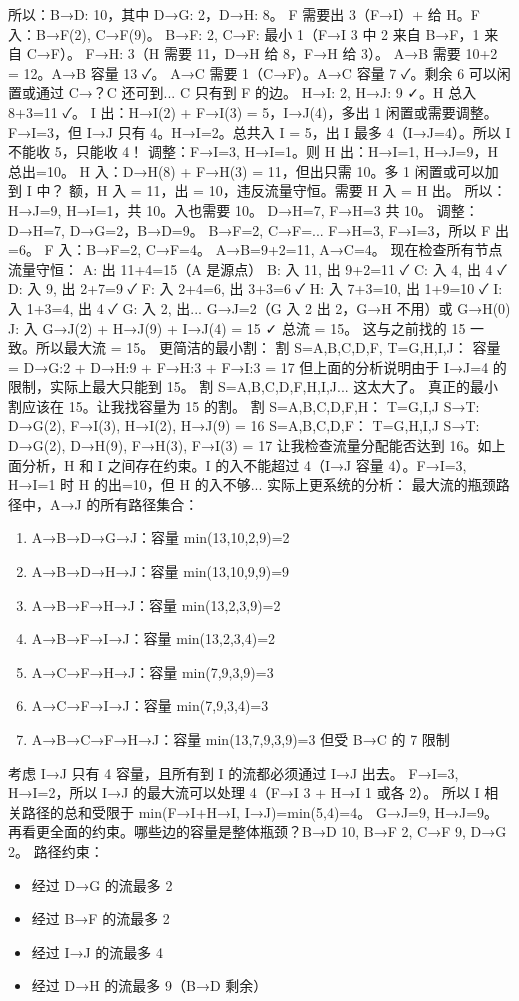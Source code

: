 \documentclass[10pt,a4paper,openany]{ctexbook}
\theoremstyle{definition}
\theoremstyle{remark}
\begin{document}
所以：B→D: 10，其中 D→G: 2，D→H: 8。
F 需要出 3（F→I）+ 给 H。F 入：B→F(2), C→F(9)。
B→F: 2, C→F: 最小 1（F→I 3 中 2 来自 B→F，1 来自 C→F）。
F→H: 3（H 需要 11，D→H 给 8，F→H 给 3）。
A→B 需要 10+2 = 12。A→B 容量 13 ✓。
A→C 需要 1（C→F）。A→C 容量 7 ✓。剩余 6 可以闲置或通过 C→？C 还可到... C 只有到 F 的边。
H→I: 2, H→J: 9 ✓。H 总入 8+3=11 ✓。
I 出：H→I(2) + F→I(3) = 5，I→J(4)，多出 1 闲置或需要调整。
F→I=3，但 I→J 只有 4。H→I=2。总共入 I = 5，出 I 最多 4（I→J=4）。所以 I 不能收 5，只能收 4！
调整：F→I=3, H→I=1。则 H 出：H→I=1, H→J=9，H 总出=10。
H 入：D→H(8) + F→H(3) = 11，但出只需 10。多 1 闲置或可以加到 I 中？
额，H 入 = 11，出 = 10，违反流量守恒。需要 H 入 = H 出。
所以：H→J=9, H→I=1，共 10。入也需要 10。
D→H=7, F→H=3 共 10。
调整：D→H=7, D→G=2，B→D=9。
B→F=2, C→F=...
F→H=3, F→I=3，所以 F 出=6。
F 入：B→F=2, C→F=4。
A→B=9+2=11, A→C=4。
现在检查所有节点流量守恒：
A: 出 11+4=15（A 是源点）
B: 入 11, 出 9+2=11 ✓
C: 入 4, 出 4 ✓
D: 入 9, 出 2+7=9 ✓
F: 入 2+4=6, 出 3+3=6 ✓
H: 入 7+3=10, 出 1+9=10 ✓
I: 入 1+3=4, 出 4 ✓
G: 入 2, 出... G→J=2（G 入 2 出 2，G→H 不用）或 G→H(0)
J: 入 G→J(2) + H→J(9) + I→J(4) = 15 ✓
总流 = 15。
这与之前找的 15 一致。所以最大流 = 15。
更简洁的最小割：
割 S={A,B,C,D,F}, T={G,H,I,J}：
容量 = D→G:2 + D→H:9 + F→H:3 + F→I:3 = 17
但上面的分析说明由于 I→J=4 的限制，实际上最大只能到 15。
割 S={A,B,C,D,F,H,I,J}... 这太大了。
真正的最小割应该在 15。让我找容量为 15 的割。
割 S={A,B,C,D,F,H}：
T={G,I,J}
S→T: D→G(2), F→I(3), H→I(2), H→J(9) = 16
S={A,B,C,D,F}：
T={G,H,I,J}
S→T: D→G(2), D→H(9), F→H(3), F→I(3) = 17
让我检查流量分配能否达到 16。如上面分析，H 和 I 之间存在约束。I 的入不能超过 4（I→J 容量 4）。F→I=3, H→I=1 时 H 的出=10，但 H 的入不够...
实际上更系统的分析：
最大流的瓶颈路径中，A→J 的所有路径集合：
\begin{enumerate}
\item A→B→D→G→J：容量 min(13,10,2,9)=2
\item A→B→D→H→J：容量 min(13,10,9,9)=9
\item A→B→F→H→J：容量 min(13,2,3,9)=2
\item A→B→F→I→J：容量 min(13,2,3,4)=2
\item A→C→F→H→J：容量 min(7,9,3,9)=3
\item A→C→F→I→J：容量 min(7,9,3,4)=3
\item A→B→C→F→H→J：容量 min(13,7,9,3,9)=3 但受 B→C 的 7 限制

\end{enumerate}

考虑 I→J 只有 4 容量，且所有到 I 的流都必须通过 I→J 出去。
F→I=3, H→I=2，所以 I→J 的最大流可以处理 4（F→I 3 + H→I 1 或各 2）。
所以 I 相关路径的总和受限于 min(F→I+H→I, I→J)=min(5,4)=4。
G→J=9, H→J=9。
再看更全面的约束。哪些边的容量是整体瓶颈？B→D 10, B→F 2, C→F 9, D→G 2。
路径约束：
\begin{itemize}
\item 经过 D→G 的流最多 2
\item 经过 B→F 的流最多 2
\item 经过 I→J 的流最多 4
\item 经过 D→H 的流最多 9（B→D 剩余）

\end{itemize}
\end{document}
